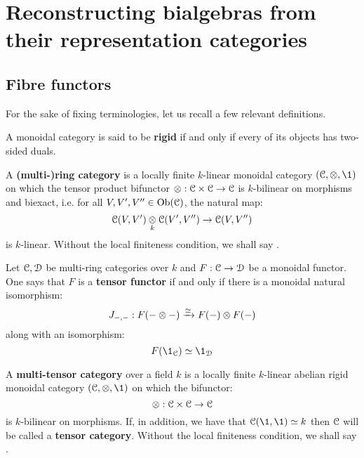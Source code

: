 \section{Reconstructing bialgebras from their representation categories}
    \subsection{Fibre functors}
        For the sake of fixing terminologies, let us recall a few relevant definitions.
        \begin{definition} \label{def: rigid_monoidal_categories}
            A monoidal category is said to be \textbf{rigid} if and only if every of its objects has two-sided duals. 
        \end{definition}
        \begin{definition} \label{def: ring_categories}
            \cite[Definition 4.1.1]{EGNO} A \textbf{(multi-)ring category} is a locally finite $k$-linear monoidal category $(\C, \tensor, \1)$ on which the tensor product bifunctor $\tensor: \C \x \C \to \C$ is $k$-bilinear on morphisms and biexact, i.e. for all $V, V', V'' \in \mathrm{Ob}(\mathcal{C})$, the natural map:
                $$\C(V, V') \tensor_k \C(V', V'') \to \C(V, V'')$$
            is $k$-linear. Without the local finiteness condition, we shall say .
        \end{definition}
        \begin{definition} \label{def: tensor_functors}
            Let $\mathcal{C}, \mathcal{D}$ be multi-ring categories over $k$ and $F: \mathcal{C} \to \mathcal{D}$ be a monoidal functor. One says that $F$ is a \textbf{tensor functor} if and only if there is a monoidal natural isomorphism:
                $$J_{-, -}: F(- \tensor -) \xrightarrow[]{\cong} F(-) \tensor F(-)$$
            along with an isomorphism:
                $$F(\1_{\C}) \cong \1_{\D}$$
        \end{definition}
        \begin{definition} \label{def: tensor_categories}
            \cite[Definition 4.1.1]{EGNO} A  \textbf{multi-tensor category} over a field $k$ is a locally finite $k$-linear abelian rigid monoidal category $(\C, \tensor, \1)$ on which the bifunctor:
                $$\tensor: \C \x \C \to \C$$
            is $k$-bilinear on morphisms. If, in addition, we have that $\C(\1, \1) \cong k$ then $\mathcal{C}$ will be called a \textbf{tensor category}. Without the local finiteness condition, we shall say .
        \end{definition}
